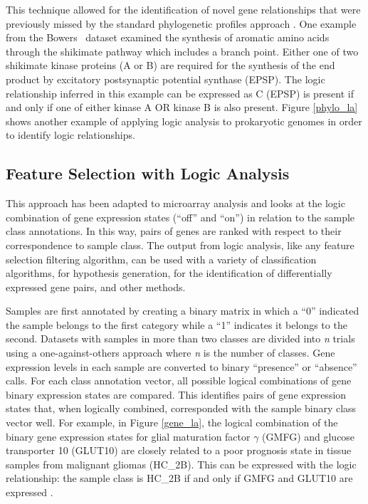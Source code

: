 This technique allowed for the identification of novel gene relationships that
were previously missed by the standard phylogenetic profiles approach
\cite{PMID_144923264}.  One example from the Bowers \ea\ dataset examined the
synthesis of aromatic amino acids through the shikimate pathway which includes
a branch point.  Either one of two shikimate kinase proteins (A or B) are
required for the synthesis of the end product by excitatory postsynaptic
potential synthase (EPSP). The logic relationship inferred in this example can
be expressed as C (EPSP) is present if and only if one of either kinase A OR
kinase B is also present.  Figure \ref{phylo_la} shows another example of
applying logic analysis to prokaryotic genomes in order to identify logic
relationships.

\subsection{Feature Selection with Logic Analysis}

This approach has been adapted to microarray analysis and looks at the logic
combination of gene expression states (``off'' and ``on'') in relation to the sample
class annotations.  In this way, pairs of genes are ranked with respect to
their correspondence to sample class.  The output from logic analysis, like any
feature selection filtering algorithm, can be used with a variety of
classification algorithms, for hypothesis generation, for the identification of
differentially expressed gene pairs, and other methods.

Samples are first annotated by creating a binary matrix in which a ``0''
indicated the sample belongs to the first category while a ``1'' indicates it
belongs to the second.  Datasets with samples in more than two classes are
divided into \emph{n} trials using a one-against-others approach where \emph{n}
is the number of classes.  Gene expression levels in each sample are converted
to binary ``presence'' or ``absence'' calls.  For each class annotation vector,
all possible logical combinations of gene binary expression states are
compared.  This identifies pairs of gene expression states that, when logically
combined, corresponded with the sample binary class vector well. For example,
in Figure \ref{gene_la}, the logical combination of the binary gene expression
states for glial maturation factor $\gamma$ (GMFG) and glucose transporter 10
(GLUT10) are closely related to a poor prognosis state in tissue samples from
malignant gliomas (HC\_2B). This can be expressed with the logic relationship:
the sample class is HC\_2B if and only if GMFG and GLUT10 are expressed
\cite{PMID_170746732}.

